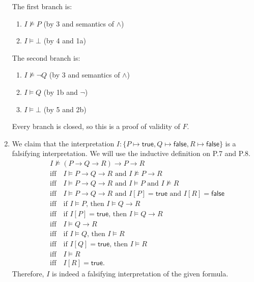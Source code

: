 \begin{exer}[1.1]
\begin{enumerate}[label=(\alph*)]
            The first branch is:
            \begin{enumerate}[label=\arabic*a.]
                \item %
                    $I \not\models P$ (by 3 and semantics of $\land$)
                \item %
                    $I \models \bot$ (by 4 and 1a)
            \end{enumerate}

            The second branch is:
            \begin{enumerate}[label=\arabic*b.]
                \item %
                    $I \not\models \neg Q$ (by 3 and semantics of $\land$)
                \item %
                    $I \models Q$ (by 1b and $\neg$)
                \item %
                    $I \models \bot$ (by 5 and 2b)
            \end{enumerate}

            Every branch is closed, so this is a proof of validity of $F$.
        \item
            We claim that the interpretation $I: \{ P \mapsto \textsf{true}, Q \mapsto \textsf{false}, R \mapsto \textsf{false} \}$ is a falsifying interpretation.
            We will use the inductive definition on P.7 and P.8.
            \begin{align*}
                &I \not\models (P \rightarrow Q \rightarrow R) \rightarrow P \rightarrow R \\
                    &\text{iff}\quad I \models P \rightarrow Q \rightarrow R \text{ and } I \not\models P \rightarrow R \\
                    &\text{iff}\quad I \models P \rightarrow Q \rightarrow R \text{ and } I \models P \text{ and } I \not\models R \\
                    &\text{iff}\quad I \models P \rightarrow Q \rightarrow R \text{ and } I[P] = \textsf{true} \text{ and } I[R] = \textsf{false} \\
                    &\text{iff}\quad \text{if } I \models P \text{, then } I \models Q \rightarrow R \\
                    &\text{iff}\quad \text{if } I[P] = \textsf{true} \text{, then } I \models Q \rightarrow R \\
                    &\text{iff}\quad I \models Q \rightarrow R \\
                    &\text{iff}\quad \text{if } I \models Q \text{, then } I \models R \\
                    &\text{iff}\quad \text{if } I[Q] = \textsf{true} \text{, then } I \models R \\
                    &\text{iff}\quad I \models R \\
                    &\text{iff}\quad I[R] = \textsf{true}.
            \end{align*}
            Therefore, $I$ is indeed a falsifying interpretation of the given formula.
    \end{enumerate}
\end{exer}

